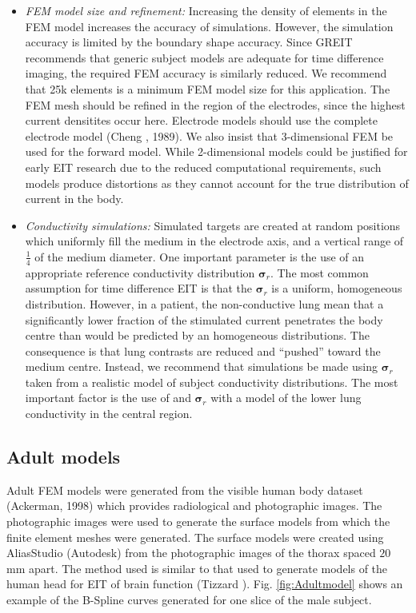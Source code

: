 \documentclass[12pt]{iopart}
\newcommand{\sG}{\mbox{${\boldsymbol \sigma}$}}
\begin{document}
\begin{itemize}
\item 
{\em FEM model size and refinement:}
Increasing the density of elements in the FEM
model increases the accuracy of simulations. However,
the simulation accuracy is limited by the boundary
shape accuracy. Since GREIT recommends that 
generic subject models are adequate for time difference
imaging, the required FEM accuracy is similarly reduced.
We recommend that 25k elements is a minimum FEM model
size for this application.
The FEM mesh should be refined in the region of
the electrodes, since the highest current densitites
occur here. Electrode models should use the
complete electrode model (Cheng \etal, 1989).
We also insist that 3-dimensional FEM be used for the
forward model. While 2-dimensional models could be
justified for early EIT research due to the reduced
computational requirements, such models produce
distortions as they cannot account for the true
distribution of current in the body.

\item
{\em Conductivity simulations:}
Simulated targets are created at random positions
which uniformly fill the medium in the electrode axis, and
a vertical range of $\frac{1}{4}$ of the medium
diameter.  One important parameter is the use of
an appropriate reference conductivity distribution
$\sG_r$. The most common assumption for time 
difference EIT is that the $\sG_r$ is a uniform,
homogeneous distribution. However, in a patient,
the non-conductive lung mean that a significantly
lower fraction of the stimulated current penetrates
the body centre than would be predicted by an
homogeneous distributions. The consequence is that
lung contrasts are reduced and ``pushed'' toward
the medium centre. Instead, we recommend that 
simulations be made using $\sG_r$ taken from a
realistic model of subject conductivity distributions.
The most important factor is the use of and $\sG_r$
with a model of the lower lung conductivity in 
the central region.

\end{itemize}



\subsection{Adult models}

Adult FEM models were generated from the visible human body dataset
(Ackerman, 1998) which provides radiological and photographic
images.  The photographic images were used to generate the surface models
from which the finite element meshes were generated.  The surface models
were created using AliasStudio (Autodesk) from the
photographic images of the thorax spaced $20~$mm apart. The method used
is similar to that used to generate models of the human head for EIT of
brain function (Tizzard ). 
Fig. \ref{fig:Adultmodel} shows an example of the
B-Spline curves generated for one slice of the male subject.
\end{document}
